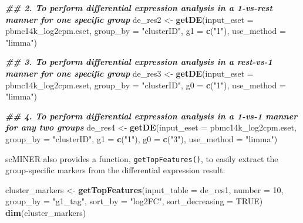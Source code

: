 \documentclass[
  12pt,
]{book}
\newenvironment{Shaded}{\begin{snugshade}}{\end{snugshade}}
\newcommand{\AttributeTok}[1]{\textcolor[rgb]{0.13,0.29,0.53}{#1}}
\newcommand{\ConstantTok}[1]{\textcolor[rgb]{0.56,0.35,0.01}{#1}}
\newcommand{\DecValTok}[1]{\textcolor[rgb]{0.00,0.00,0.81}{#1}}
\newcommand{\DocumentationTok}[1]{\textcolor[rgb]{0.56,0.35,0.01}{\textbf{\textit{#1}}}}
\newcommand{\FunctionTok}[1]{\textcolor[rgb]{0.13,0.29,0.53}{\textbf{#1}}}
\newcommand{\NormalTok}[1]{#1}
\newcommand{\OtherTok}[1]{\textcolor[rgb]{0.56,0.35,0.01}{#1}}
\newcommand{\StringTok}[1]{\textcolor[rgb]{0.31,0.60,0.02}{#1}}
\begin{document}
\begin{Shaded}
\begin{Highlighting}[]
\DocumentationTok{\#\# 2. To perform differential expression analysis in a 1{-}vs{-}rest manner for one specific group}
\NormalTok{de\_res2 }\OtherTok{\textless{}{-}} \FunctionTok{getDE}\NormalTok{(}\AttributeTok{input\_eset =}\NormalTok{ pbmc14k\_log2cpm.eset, }\AttributeTok{group\_by =} \StringTok{"clusterID"}\NormalTok{, }\AttributeTok{g1 =} \FunctionTok{c}\NormalTok{(}\StringTok{"1"}\NormalTok{), }\AttributeTok{use\_method =} \StringTok{"limma"}\NormalTok{)}

\DocumentationTok{\#\# 3. To perform differential expression analysis in a rest{-}vs{-}1 manner for one specific group}
\NormalTok{de\_res3 }\OtherTok{\textless{}{-}} \FunctionTok{getDE}\NormalTok{(}\AttributeTok{input\_eset =}\NormalTok{ pbmc14k\_log2cpm.eset, }\AttributeTok{group\_by =} \StringTok{"clusterID"}\NormalTok{, }\AttributeTok{g0 =} \FunctionTok{c}\NormalTok{(}\StringTok{"1"}\NormalTok{), }\AttributeTok{use\_method =} \StringTok{"limma"}\NormalTok{)}

\DocumentationTok{\#\# 4. To perform differential expression analysis in a 1{-}vs{-}1 manner for any two groups}
\NormalTok{de\_res4 }\OtherTok{\textless{}{-}} \FunctionTok{getDE}\NormalTok{(}\AttributeTok{input\_eset =}\NormalTok{ pbmc14k\_log2cpm.eset, }\AttributeTok{group\_by =} \StringTok{"clusterID"}\NormalTok{, }\AttributeTok{g1 =} \FunctionTok{c}\NormalTok{(}\StringTok{"1"}\NormalTok{), }\AttributeTok{g0 =} \FunctionTok{c}\NormalTok{(}\StringTok{"3"}\NormalTok{), }\AttributeTok{use\_method =} \StringTok{"limma"}\NormalTok{)}
\end{Highlighting}
\end{Shaded}

scMINER also provides a function, \texttt{getTopFeatures()}, to easily extract the group-specific markers from the differential expression result:

\begin{Shaded}
\begin{Highlighting}[]
\NormalTok{cluster\_markers }\OtherTok{\textless{}{-}} \FunctionTok{getTopFeatures}\NormalTok{(}\AttributeTok{input\_table =}\NormalTok{ de\_res1, }\AttributeTok{number =} \DecValTok{10}\NormalTok{, }\AttributeTok{group\_by =} \StringTok{"g1\_tag"}\NormalTok{, }\AttributeTok{sort\_by =} \StringTok{"log2FC"}\NormalTok{, }\AttributeTok{sort\_decreasing =} \ConstantTok{TRUE}\NormalTok{)}
\FunctionTok{dim}\NormalTok{(cluster\_markers)}
\end{Highlighting}
\end{Shaded}
\end{document}

